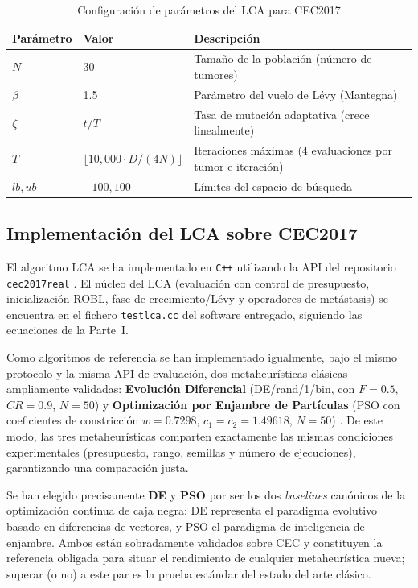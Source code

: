 \begin{table}[h!]
\centering
\caption{Configuración de parámetros del LCA para CEC2017}
\label{tab:params_lca}
\renewcommand{\arraystretch}{1.3}
\footnotesize
\begin{tabular}{@{}lll@{}}
\toprule
\textbf{Parámetro} & \textbf{Valor} & \textbf{Descripción} \\
\midrule
$N$ & 30 & Tamaño de la población (número de tumores) \\
$\beta$ & 1.5 & Parámetro del vuelo de Lévy (Mantegna) \\
$\zeta$ & $t/T$ & Tasa de mutación adaptativa (crece linealmente) \\
$T$ & $\lfloor 10{,}000 \cdot D / (4N) \rfloor$ & Iteraciones máximas (4 evaluaciones por tumor e iteración) \\
$lb, ub$ & $-100, 100$ & Límites del espacio de búsqueda \\
\bottomrule
\end{tabular}
\end{table}

\subsection{Implementación del LCA sobre CEC2017}

El algoritmo LCA se ha implementado en \texttt{C++} utilizando la API del repositorio
\texttt{cec2017real} \cite{molina2017cec}. El núcleo del LCA (evaluación con control de
presupuesto, inicialización ROBL, fase de crecimiento/Lévy y operadores de metástasis) se
encuentra en el fichero \texttt{testlca.cc} del software entregado, siguiendo las ecuaciones
de la Parte~I.

Como algoritmos de referencia se han implementado igualmente, bajo el mismo protocolo
y la misma API de evaluación, dos metaheurísticas clásicas ampliamente validadas:
\textbf{Evolución Diferencial} (DE/rand/1/bin, con $F=0.5$, $CR=0.9$, $N=50$) \cite{storn1997de}
y \textbf{Optimización por Enjambre de Partículas} (PSO con coeficientes de constricción
$w=0.7298$, $c_1=c_2=1.49618$, $N=50$) \cite{kennedy1995pso}. De este modo, las tres
metaheurísticas comparten exactamente las mismas condiciones experimentales (presupuesto,
rango, semillas y número de ejecuciones), garantizando una comparación justa.

Se han elegido precisamente \textbf{DE} y \textbf{PSO} por ser los dos \emph{baselines}
canónicos de la optimización continua de caja negra: DE \cite{storn1997de} representa el
paradigma evolutivo basado en diferencias de vectores, y PSO \cite{kennedy1995pso} el
paradigma de inteligencia de enjambre. Ambos están sobradamente validados sobre CEC y
constituyen la referencia obligada para situar el rendimiento de cualquier metaheurística
nueva; superar (o no) a este par es la prueba estándar del estado del arte clásico.

